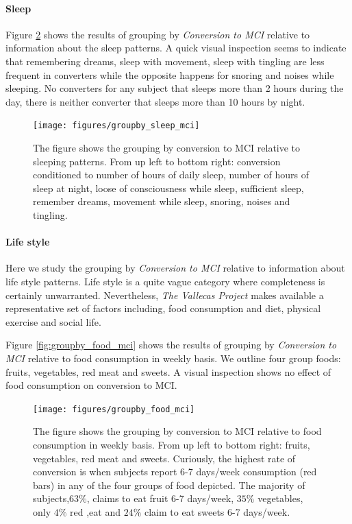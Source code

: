 \documentclass[11pt]{article}
\theoremstyle{definition}
\theoremstyle{remark}
\begin{document}
\paragraph*{Sleep}

Figure \ref{fig:groupby_sleep_mci} shows the results of grouping by \emph{Conversion to MCI} relative to information about the sleep patterns. A quick visual inspection seems to indicate that remembering dreams, sleep with movement, sleep with tingling are less frequent in converters while the opposite happens for snoring and noises while sleeping. No converters for any subject that sleeps more than 2 hours during the day, there is neither converter that sleeps more than 10 hours by night.

\begin{figure}[H]
        \centering
        \texttt{[image: figures/groupby\_sleep\_mci]}
        \caption{The figure shows the grouping by conversion to MCI relative to sleeping patterns. From up left to bottom right: conversion conditioned to number of hours of daily sleep, number of hours of sleep at night, loose of consciousness while sleep, sufficient sleep, remember dreams, movement while sleep, snoring, noises and tingling.} 
        \label{fig:groupby_sleep_mci}
\end{figure}


\paragraph*{Life style}
Here we study the grouping by \emph{Conversion to MCI} relative to information about life style patterns. Life style is a quite vague  category where completeness is certainly unwarranted. Nevertheless, \emph{The Vallecas Project} makes available a representative set of factors including, food consumption and diet, physical exercise and social life.

Figure \ref{fig:groupby_food_mci} shows the results of grouping by \emph{Conversion to MCI} relative to food consumption in weekly basis. We outline four group foods: fruits, vegetables, red meat and sweets. A visual inspection shows no effect of food consumption on conversion to MCI. %

\begin{figure}[H]
        \centering
        \texttt{[image: figures/groupby\_food\_mci]}
        \caption{The figure shows the grouping by conversion to MCI relative to food consumption in weekly basis. From up left to bottom right: fruits, vegetables, red meat and sweets.  Curiously, the highest rate of conversion is when subjects report 6-7 days/week consumption (red bars) in any of the four groups of food depicted. The majority of subjects,$63\%$, claims to eat fruit 6-7 days/week, $35\%$ vegetables, only $4\%$ red ,eat and $24\%$ claim to eat sweets 6-7 days/week.} 
        \label{fig:groupby_sleep_mci}
\end{figure}
\end{document}
